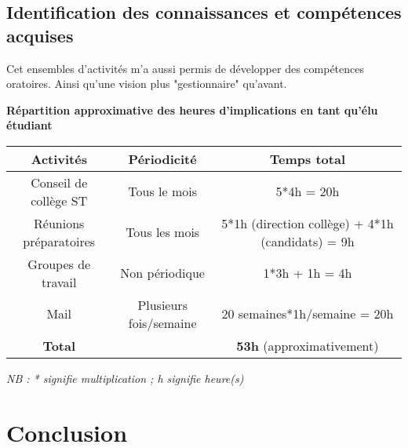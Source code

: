 \documentclass{article}
\begin{document}
\subsection{Identification des connaissances et compétences acquises}



Cet ensembles d'activités m'a aussi permis de développer des compétences oratoires. Ainsi qu'une vision plus "gestionnaire" qu'avant.
\newpage
\begin{center}
\textbf{Répartition approximative des heures d'implications en tant qu'élu étudiant}
\vspace*{10pt}

\begin{tabular}{|c|c|c|}
\hline 
Activités & Périodicité & Temps total\\ 
\hline 
Conseil de collège ST & Tous le mois & 5*4h = 20h \\ 
\hline 
Réunions préparatoires & Tous les mois & 5*1h (direction collège) + 4*1h (candidats) = 9h\\ 
\hline 
Groupes de travail & Non périodique & 1*3h + 1h = 4h\\ 
\hline 
Mail & Plusieurs fois/semaine & 20 semaines*1h/semaine = 20h\\ 
\hline 
\textbf{Total} &  & \textbf{53h} (approximativement) \\ 
\hline 
\end{tabular} 
\end{center}
\textit{NB : * signifie multiplication ; h signifie heure(s)}

\section*{Conclusion}
\end{document}
